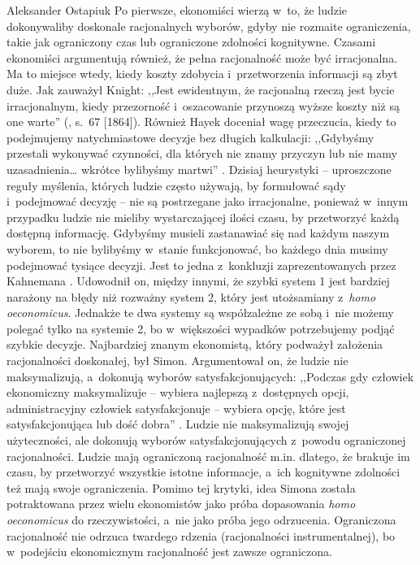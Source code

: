 \begin{artplenv}{Aleksander Ostapiuk}
Po pierwsze, ekonomiści wierzą w~to, że ludzie dokonywaliby doskonale racjonalnych wyborów, gdyby nie rozmaite
ograniczenia, takie jak ograniczony czas lub ograniczone zdolności kognitywne. Czasami ekonomiści argumentują również,
że pełna racjonalność może być irracjonalna. Ma to miejsce wtedy, kiedy koszty zdobycia i~przetworzenia informacji są
zbyt duże. Jak zauważył \mbox{Knight}: ,,Jest ewidentnym, że racjonalną rzeczą jest bycie irracjonalnym, kiedy
przezorność i~oszacowanie przynoszą wyższe koszty niż są one warte''
(\cite{knight_risk_1921}, s.~67 [1864]).
Również Hayek doceniał wagę przeczucia, kiedy to podejmujemy natychmiastowe decyzje bez długich
kalkulacji: ,,Gdybyśmy przestali wykonywać czynności, dla których nie znamy przyczyn lub nie mamy uzasadnienia… wkrótce
bylibyśmy martwi''
\parencite[s.~68]{hayek_fatal_1988}.
Dzisiaj heurystyki -- uproszczone reguły myślenia,
których ludzie często używają, by formułować sądy i~podejmować decyzję -- nie są postrzegane jako irracjonalne, ponieważ
w~innym przypadku ludzie nie mieliby wystarczającej ilości czasu, by przetworzyć każdą dostępną informację. Gdybyśmy musieli zastanawiać
się nad każdym naszym wyborem, to nie bylibyśmy w~stanie funkcjonować, bo każdego dnia musimy podejmować tysiące
decyzji. Jest to jedna z~konkluzji zaprezentowanych przez Kahnemana
\parencite*{kahneman_pulapki_2012}.
Udowodnił on,
między innymi, że szybki system 1 jest bardziej narażony na błędy niż rozważny system 2, który jest
utożsamiany z~\textit{homo oeconomicus}. Jednakże te dwa systemy są współzależne ze sobą i~nie możemy
polegać tylko na systemie 2, bo
w~większości wypadków potrzebujemy podjąć szybkie decyzje. Najbardziej znanym ekonomistą, który podważył założenia
racjonalności doskonałej, był Simon. Argumentował on, że ludzie nie maksymalizują, a~dokonują wyborów
satysfakcjonujących: ,,Podczas gdy człowiek ekonomiczny maksymalizuje -- wybiera najlepszą z~dostępnych opcji,
administracyjny człowiek satysfakcjonuje -- wybiera opcję, które jest satysfakcjonująca lub dość dobra''
\parencite[s.~XXIX]{simon_administrative_1947}.
Ludzie nie maksymalizują swojej użyteczności, ale dokonują wyborów
satysfakcjonujących z~powodu ograniczonej racjonalności. Ludzie mają ograniczoną racjonalność m.in. dlatego, że
brakuje im czasu, by przetworzyć wszystkie istotne informacje, a~ich kognitywne zdolności też mają swoje ograniczenia.
Pomimo tej krytyki, idea Simona została potraktowana przez wielu ekonomistów jako próba dopasowania \textit{homo
oeconomicus} do rzeczywistości, a~nie jako próba jego odrzucenia. Ograniczona racjonalność nie odrzuca twardego rdzenia
(racjonalności instrumentalnej), bo w~podejściu ekonomicznym racjonalność jest zawsze ograniczona.


\end{artplenv}
